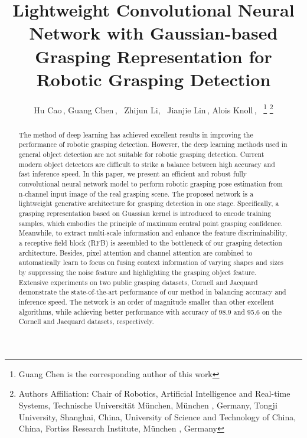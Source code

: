 \documentclass[journal]{IEEEtran}
\begin{document}
\title{Lightweight Convolutional Neural Network with Gaussian-based Grasping Representation for Robotic Grasping Detection}

\author{Hu Cao\,,  Guang Chen\,,~ Zhijun Li,~ Jianjie Lin\,, Alois Knoll\,,~
\thanks{Guang Chen is the corresponding author of this work}
	\thanks{Authors Affiliation: Chair of Robotics, Artificial Intelligence and Real-time Systems, Technische Universit\"at M\"unchen, M\"unchen , Germany,
Tongji University, Shanghai, China,
		University of Science and Technology of China, China,
		Fortiss Research Institute, M\"unchen , Germany
}}
\maketitle

\begin{abstract}
The method of deep learning has achieved excellent results in improving the performance of robotic grasping detection. However, the deep learning methods used in general object detection are not suitable for robotic grasping detection. Current modern object detectors are difficult to strike a balance between high accuracy and fast inference speed. In this paper, we present an efficient and robust fully convolutional neural network model to perform robotic grasping pose estimation from n-channel input image of the real grasping scene. The proposed network is a lightweight generative architecture for grasping detection in one stage. Specifically, a grasping representation based on Guassian kernel is introduced to encode training samples, which embodies the principle of maximum central point grasping confidence. Meanwhile, to extract multi-scale information and enhance the feature discriminability, a receptive field block (RFB) is assembled to the bottleneck of our grasping detection architecture. Besides, pixel attention and channel attention are combined to automatically learn to focus on fusing context information of varying shapes and sizes by suppressing the noise feature and highlighting the grasping object feature. Extensive experiments on two public grasping datasets, Cornell and Jacquard demonstrate the state-of-the-art performance of our method in balancing accuracy and inference speed. The network is an order of magnitude smaller than other excellent algorithms, while achieving better performance with accuracy of 98.9 and 95.6 on the Cornell and Jacquard datasets, respectively. 


\end{abstract}
\end{document}
